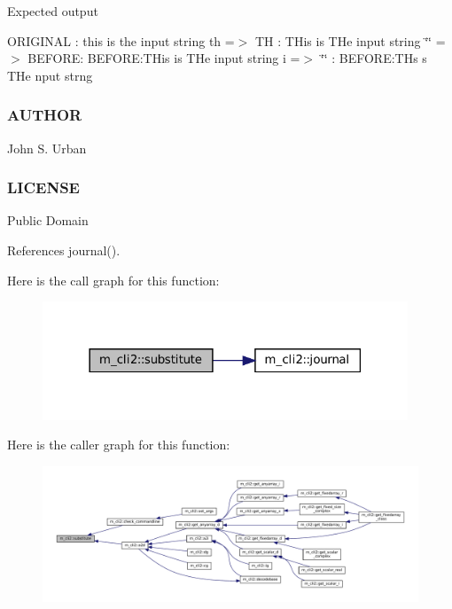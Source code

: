 Expected output

O\+R\+I\+G\+I\+N\+AL \+: this is the input string th =$>$ TH \+: T\+His is T\+He input string \char`\"{}\char`\"{} =$>$ B\+E\+F\+O\+RE\+: B\+E\+F\+O\+RE\+:T\+His is T\+He input string i =$>$ \char`\"{}\char`\"{} \+: B\+E\+F\+O\+RE\+:T\+Hs s T\+He nput strng \subsubsection*{A\+U\+T\+H\+OR}

John S. Urban \subsubsection*{L\+I\+C\+E\+N\+SE}

Public Domain 

References journal().

Here is the call graph for this function\+:
\nopagebreak
\begin{figure}[H]
\begin{center}
\leavevmode
\includegraphics[width=309pt]{namespacem__cli2_a76af7f7c39e6755e024890d85d488704_cgraph}
\end{center}
\end{figure}
Here is the caller graph for this function\+:
\nopagebreak
\begin{figure}[H]
\begin{center}
\leavevmode
\includegraphics[width=350pt]{namespacem__cli2_a76af7f7c39e6755e024890d85d488704_icgraph}
\end{center}
\end{figure}
\mbox{\label{namespacem__cli2_a770a66475094fd80493d46498de1ebf7}} 
